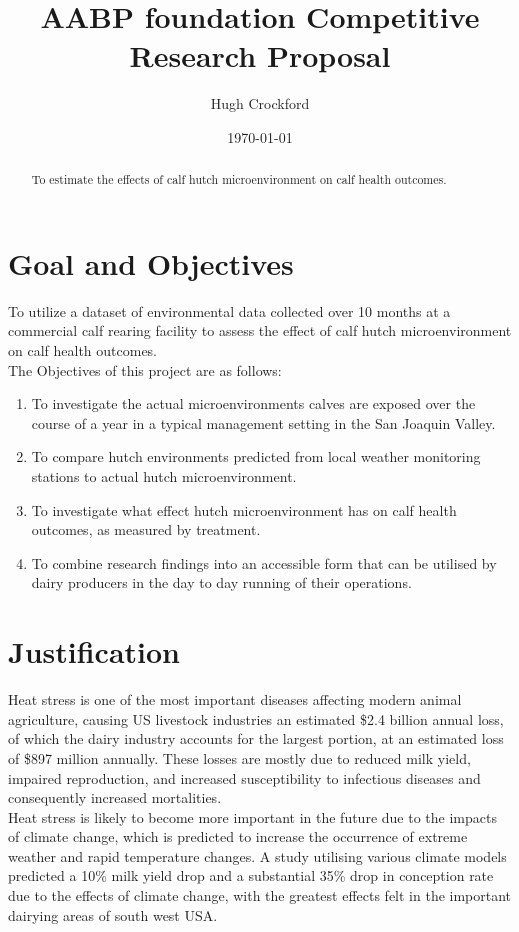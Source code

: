 \documentclass[12pt]{article}
\title{AABP foundation Competitive Research Proposal}
\author{Hugh Crockford}
\date{\today}
\begin{document}
	\maketitle
	\tableofcontents
	
	\newpage
	\begin{abstract}
		To estimate the effects of calf hutch microenvironment on calf health outcomes.
	\end{abstract}
	\section{Goal and Objectives}
	To utilize a dataset of environmental data collected over 10 months at a commercial calf rearing facility to assess the effect of calf hutch microenvironment on calf health outcomes.\\


	The Objectives of this project are as follows:
	\begin{enumerate}
		\item To investigate the actual microenvironments calves are exposed over the course of a year in a typical management setting in the San Joaquin Valley.
		\item To compare hutch environments predicted from local weather monitoring stations to actual hutch microenvironment.
		\item To investigate what effect hutch microenvironment has on calf health outcomes, as measured by treatment.
		\item To combine research findings into an accessible form that can be utilised by dairy producers in the day to day running of their operations.
	\end{enumerate}


	\newpage
	\section{Justification}
	Heat stress is one of the most important diseases affecting modern animal agriculture, causing US livestock industries an estimated \$2.4 billion annual loss, of which the dairy industry accounts for the largest portion, at an estimated loss of \$897 million annually\cite{St-Pierre2003}. 
	These losses are mostly due to reduced milk yield, impaired reproduction, and increased susceptibility to infectious diseases and consequently increased mortalities.\cite{Kadzere2002,Hammami2013}\\
	Heat stress is likely to become more important in the future due to the impacts of climate change, which is predicted to increase the occurrence of extreme weather and rapid temperature changes\cite{Parry2007}. A study utilising various climate models predicted a 10\% milk yield drop and a substantial 35\% drop in conception rate due to the effects of climate change, with the greatest effects felt in the important dairying areas of south west USA\cite{Klinedinst1993}.\\
\end{document}
